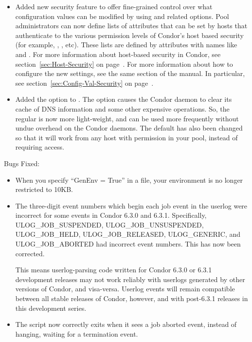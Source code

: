 \begin{itemize}

\item Added new security feature to offer fine-grained control over
what configuration values can be modified by 
using  and related options.
Pool administrators can now define lists of attributes that can be set
by hosts that authenticate to the various permission levels of
Condor's host based security (for example, ,
, etc).
These lists are defined by attributes with names like
 and
. 
For more information about host-based security in Condor, see
section~\ref{sec:Host-Security} on page~\pageref{sec:Host-Security}.
For more information about how to configure the new settings, see the
same section of the manual.
In particular, see section~\ref{sec:Config-Val-Security} on
page~\pageref{sec:Config-Val-Security}. 

\item Added the  option to .
The  option causes the Condor daemon to clear its cache of
DNS information and some other expensive operations.
So, the regular  is now more light-weight, and can
be used more frequently without undue overhead on the Condor daemons. 
The default  has also been changed so that it will
work from any host with  permission in your pool,
instead of requiring  access.

\end{itemize}

\noindent Bugs Fixed:

\begin{itemize}

\item 
When you specify ``GenEnv = True'' in a  file,
your environment is no longer restricted to 10KB.

\item
The three-digit event numbers which begin each job event in the
userlog were incorrect for some events in Condor 6.3.0 and 6.3.1.
Specifically, ULOG\_JOB\_SUSPENDED, ULOG\_JOB\_UNSUSPENDED,
ULOG\_JOB\_HELD, ULOG\_JOB\_RELEASED, ULOG\_GENERIC, and
ULOG\_JOB\_ABORTED had incorrect event numbers.  This has now been
corrected.

\Note This means userlog-parsing code written for Condor 6.3.0 or
6.3.1 development releases may not work reliably with userlogs
generated by other versions of Condor, and visa-versa.  Userlog events
will remain compatible between all stable releases of Condor, however,
and with post-6.3.1 releases in this development series.

\item
The  script now correctly exits when it sees a job aborted
event, instead of hanging, waiting for a termination event.

\end{itemize}

